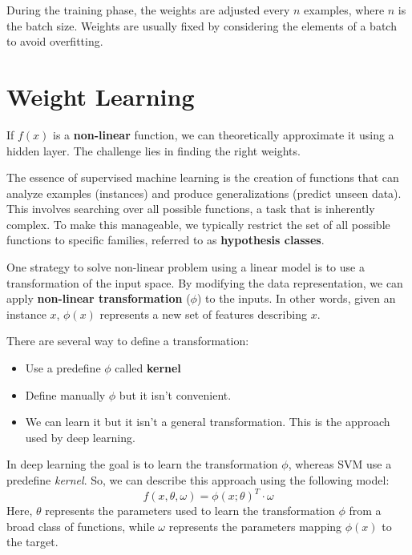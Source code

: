 \begin{note}
    During the training phase, the weights are adjusted every $n$ examples,
    where $n$ is the batch size. Weights are usually fixed by considering the
    elements of a batch to avoid overfitting.
\end{note}
\section{Weight Learning}
If $f(x)$ is a \textbf{non-linear} function, we can theoretically approximate it
using a hidden layer. The challenge lies in finding the right weights.

The essence of supervised machine learning is the creation of functions that can
analyze examples (instances) and produce generalizations (predict unseen data).
This involves searching over all possible functions, a task that is inherently
complex. To make this manageable, we typically restrict the set of all possible
functions to specific families, referred to as \textbf{hypothesis classes}.

One strategy to solve non-linear problem using a linear model is to use a
transformation of the input space. By modifying the data representation, we can
apply \textbf{non-linear transformation} ($\phi$) to the inputs. In other words,
given an instance $x$, $\phi(x)$ represents a new set of features describing $x$.

There are several way to define a transformation:
\begin{itemize}
    \item Use a predefine $\phi$ called \textbf{kernel}
    \item Define manually $\phi$ but it isn't convenient.
    \item We can learn it but it isn't a general transformation. This is the
          approach used by deep learning.
\end{itemize}

In deep learning the goal is to learn the transformation $\phi$, whereas SVM use
a predefine \textit{kernel}. So, we can describe this approach using the
following model:
\begin{equation}
    f(x, \theta, \omega) = \phi(x; \theta)^T \cdot \omega
\end{equation}
Here, $\theta$ represents the parameters used to learn the transformation $\phi$
from a broad class of functions, while $\omega$ represents the parameters mapping
$\phi(x)$ to the target.


